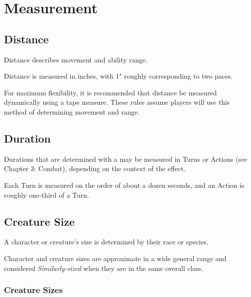 
\chapter{Measurement}



\section{Distance}
Distance describes movement and ability range.

\vspace{0.4em}

Distance is measured in inches, with 1" roughly corresponding to two paces.

\vspace{0.4em}

For maximum flexibility,  
it is recommended that distance be measured dynamically using a tape measure.
These rules assume players will use this method of determining 
movement and range.



\section{Duration}
Durations that are determined with a  may be measured in 
Turns or Actions (see Chapter 3: Combat), 
depending on the context of the effect.

\vspace{0.4em}

Each Turn is measured on the order of about a dozen seconds,
and an Action is roughly one-third of a Turn.



\section{Creature Size}
A character or creature's size is determined by their race or species.

\vspace{0.4em}

Character and creature sizes are approximate in a wide general range 
and considered \textit{Similarly-sized} when they are in the same overall class.

\subsection{Creature Sizes}

